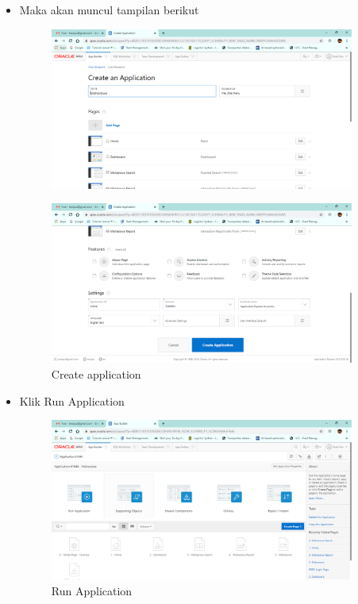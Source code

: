 \begin{itemize}
    \newpage
    
    \item Maka akan muncul tampilan berikut
    \begin{figure}[!htbp]
        \centering
        \includegraphics[width=10cm]{figures/11.PNG}
    \end{figure}
    \begin{figure}[!htbp]
        \centering
        \includegraphics[width=10cm]{figures/12.PNG}
        \caption{Create application}
    \end{figure}
    
    \item Klik Run Application 
     \begin{figure}[!htbp]
        \centering
        \includegraphics[width=10cm]{figures/13.PNG}
        \caption{Run Application}
    \end{figure}
    

\end{itemize}
